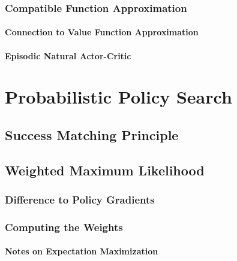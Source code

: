			\subsubsection{Compatible Function Approximation} %

				\paragraph{Connection to Value Function Approximation} %

				\paragraph{Episodic Natural Actor-Critic} %

	\section{Probabilistic Policy Search} %

		\subsection{Success Matching Principle} %

		\subsection{Weighted Maximum Likelihood} %

			\subsubsection{Difference to Policy Gradients} %

			\subsubsection{Computing the Weights} %

				\paragraph{Notes on Expectation Maximization} %

